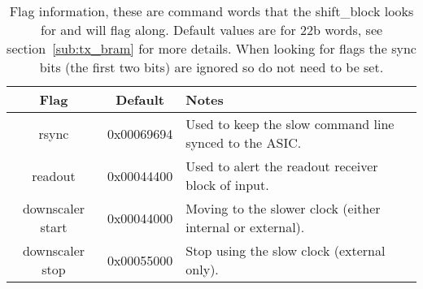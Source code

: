 \documentclass[]{article}
\begin{document}
    \begin{table}
        \begin{center}
        \begin{tabular}{c|c|l}
            Flag             & Default    & Notes \\
            \hline
            rsync            & 0x00069694 & Used to keep the slow command line synced to the ASIC.   \\
            readout          & 0x00044400 & Used to alert the readout receiver block of input.       \\
            downscaler start & 0x00044000 & Moving to the slower clock (either internal or external).\\
            downscaler stop  & 0x00055000 & Stop using the slow clock (external only).               \\
        \end{tabular}
        \end{center}
        \caption{Flag information, these are command words that the shift\_block looks for and will flag along. Default values are for 22b words, see section~\ref{sub:tx_bram} for more details. When looking for flags the sync bits (the first two bits) are ignored so do not need to be set.}
        \label{tab:shift_block_flags}
    \end{table}
    
\end{document}
